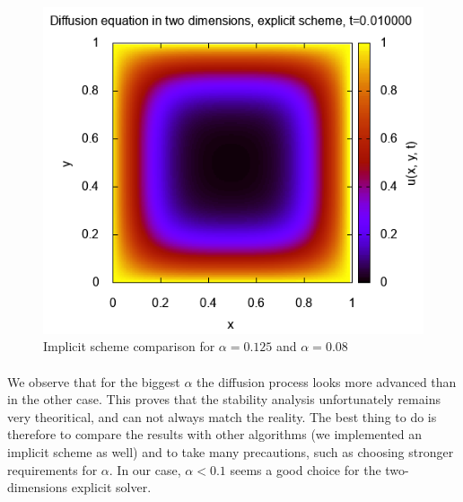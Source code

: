 \documentclass[a4paper, twoside, 11pt]{report}
\theoremstyle{theorem}
\theoremstyle{remark}
\theoremstyle{exemple}
\begin{document}
\begin{figure}[h!]
{\begin{minipage}[c]{.30\linewidth}
                        \includegraphics[scale = 0.6]{images/alpha=0,08-t1.png}
                    \end{minipage}
                }
                \caption{Implicit scheme comparison for $\alpha=0.125$ and $\alpha=0.08$}
            \end{figure}

            \paragraph{}We observe that for the biggest $\alpha$ the diffusion process looks more advanced than in the other case. This proves that the stability analysis unfortunately remains very theoritical, and can not always match the reality. The best thing to do is therefore to compare the results with other algorithms (we implemented an implicit scheme as well) and to take many precautions, such as choosing stronger requirements for $\alpha$. In our case, $\alpha < 0.1$ seems a good choice for the two-dimensions explicit solver.
\end{document}
